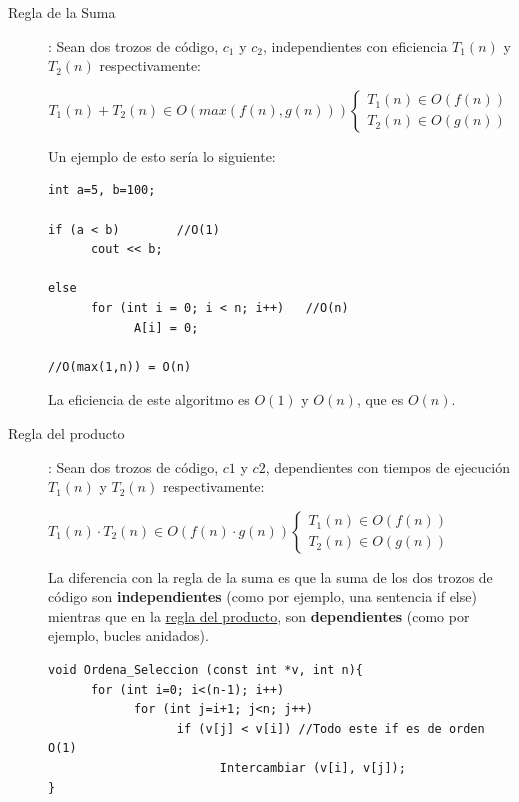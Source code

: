 \documentclass[10pt,a4paper,spanish]{report}
\theoremstyle{definition}
\theoremstyle{remark}
\begin{document}
    \begin{description}
    \label{reglas_efic}
        \item[Regla de la Suma]: Sean dos trozos de código, $c_1$ y $c_2$, independientes con eficiencia $T_1(n)$ y $T_2(n)$ respectivamente:

        \begin{displaymath}
T_{1}(n) + T_{2}(n) \in O(max(f(n),g(n))) \left\{ \begin{array}{ll}
T_{1}(n) \in O(f(n))\\
T_{2}(n) \in O(g(n))
\end{array} \right.
\end{displaymath}

    Un ejemplo de esto sería lo siguiente:

\begin{verbatim}
int a=5, b=100;

if (a < b)        //O(1)
      cout << b;

else
      for (int i = 0; i < n; i++)   //O(n)
            A[i] = 0;

//O(max(1,n)) = O(n)
\end{verbatim}

    La eficiencia de este algoritmo es $O(1)$ y $O(n)$, que es $O(n)$.

    \item[Regla del producto]: Sean dos trozos de código, $c1$ y $c2$, dependientes con tiempos de ejecución $T_{1}(n)$ y $T_{2}(n)$ respectivamente:

\begin{center}
$T_{1}(n) \cdot T_{2}(n) \in O(f(n) \cdot g(n)) \left\{ \begin{array}{ll}
T_{1}(n) \in O(f(n))\\
T_{2}(n) \in O(g(n))
\end{array} \right.$
\end{center}

    La diferencia con la regla de la suma es que la suma de los dos trozos de código son \textbf{\textcolor{YellowOrange}{independientes}} (como por ejemplo, una sentencia if else) mientras que en la \hyperref[reglas_efic]{regla del producto}, son \textbf{\textcolor{YellowOrange}{dependientes}} (como por ejemplo, bucles anidados).


\begin{verbatim}
void Ordena_Seleccion (const int *v, int n){
      for (int i=0; i<(n-1); i++)
            for (int j=i+1; j<n; j++)
                  if (v[j] < v[i]) //Todo este if es de orden O(1)
                        Intercambiar (v[i], v[j]);
}


\end{verbatim}
\end{description}
\end{document}
